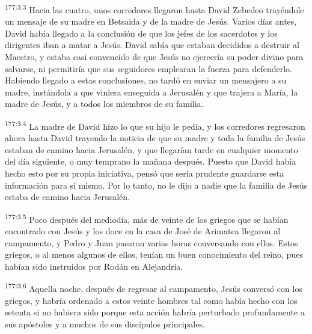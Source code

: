 \par 
\textsuperscript{177:3.3} Hacia las cuatro, unos corredores llegaron hasta David Zebedeo trayéndole un mensaje de su madre en Betsaida y de la madre de Jesús. Varios días antes, David había llegado a la conclusión de que los jefes de los sacerdotes y los dirigentes iban a matar a Jesús. David sabía que estaban decididos a destruir al Maestro, y estaba casi convencido de que Jesús no ejercería su poder divino para salvarse, ni permitiría que sus seguidores emplearan la fuerza para defenderlo. Habiendo llegado a estas conclusiones, no tardó en enviar un mensajero a su madre, instándola a que viniera enseguida a Jerusalén y que trajera a María, la madre de Jesús, y a todos los miembros de su familia.

\par 
\textsuperscript{177:3.4} La madre de David hizo lo que su hijo le pedía, y los corredores regresaron ahora hasta David trayendo la noticia de que su madre y toda la familia de Jesús estaban de camino hacia Jerusalén, y que llegarían tarde en cualquier momento del día siguiente, o muy temprano la mañana después. Puesto que David había hecho esto por su propia iniciativa, pensó que sería prudente guardarse esta información para sí mismo. Por lo tanto, no le dijo a nadie que la familia de Jesús estaba de camino hacia Jerusalén.

\par 
\textsuperscript{177:3.5} Poco después del mediodía, más de veinte de los griegos que se habían encontrado con Jesús y los doce en la casa de José de Arimatea llegaron al campamento, y Pedro y Juan pasaron varias horas conversando con ellos. Estos griegos, o al menos algunos de ellos, tenían un buen conocimiento del reino, pues habían sido instruidos por Rodán en Alejandría.

\par 
\textsuperscript{177:3.6} Aquella noche, después de regresar al campamento, Jesús conversó con los griegos, y habría ordenado a estos veinte hombres tal como había hecho con los setenta si no hubiera sido porque esta acción habría perturbado profundamente a sus apóstoles y a muchos de sus discípulos principales.

